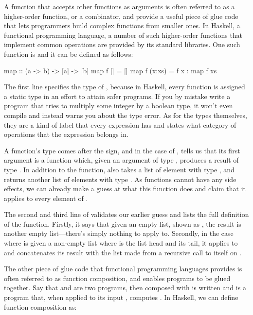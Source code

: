 \documentclass[../main.tex]{subfiles}
\begin{document}
A function that accepts other functions as arguments is often referred to as a higher-order function, or a combinator, and provide a useful piece of glue code that lets programmers build complex functions from smaller ones. In Haskell, a functional programming language, a number of such higher-order functions that implement common operations are provided by its standard libraries. One such function is  and it can be defined as follows:

\begin{code}
map :: (a -> b) -> [a] -> [b]
map f []     = []
map f (x:xs) = f x : map f xs
\end{code}

The first line specifies the type of , because in Haskell, every function is assigned a static type in an effort to attain safer programs. If you by mistake write a program that tries to multiply some integer by a boolean type, it won't even compile and instead warns you about the type error. As for the types themselves, they are a kind of label that every expression has and states what category of operations that the expression belongs in.

A function's type comes after the \codei{::} sign, and in the case of , tells us that its first argument is a function  which, given an argument of type , produces a result of type . In addition to the function,  also takes a list  of element with type , and returns another list of elements with type . As functions cannot have any side effects, we can already make a guess at what this function does and claim that it applies  to every element of .

The second and third line of  validates our earlier guess and lists the full definition of the function. Firstly, it says that given an empty list, shown as \codei{[]}, the result is another empty list---there's simply nothing to apply  to. Secondly, in the case where  is given a non-empty list  where  is the list head and  its tail, it applies  to  and concatenates its result with the list made from a recursive call to itself on .

The other piece of glue code that functional programming languages provides is often referred to as function composition, and enables programs to be glued together. Say that  and  are two programs, then  composed with  is written  and is a program that, when applied to its input , computes . In Haskell, we can define function composition as:
\end{document}
